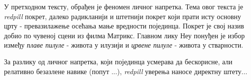 \documentclass[b5paper]{article}
\begin{document}
\large

У претходном тексту, обрађен је феномен личног напретка. Тема овог текста је \textit{redpill} покрет, далеко радикланији и штетнији покрет који прати исту основну црту - превазилажење осећања мање вредности појединца. Покрет је свој назив добио по чувеној сцени из филма Матрикс. Главном лику Неу понуђен је избор између \textit{плаве пилуле} - живота у илузији и \textit{црвене пилуле} - живота у стварности.

За разлику од личног напретка, који појединца усмерава да бескорисне, али релативно безазлене навике (попут ...), \textit{redpill} уверења наносе директну штету...
\end{document}

